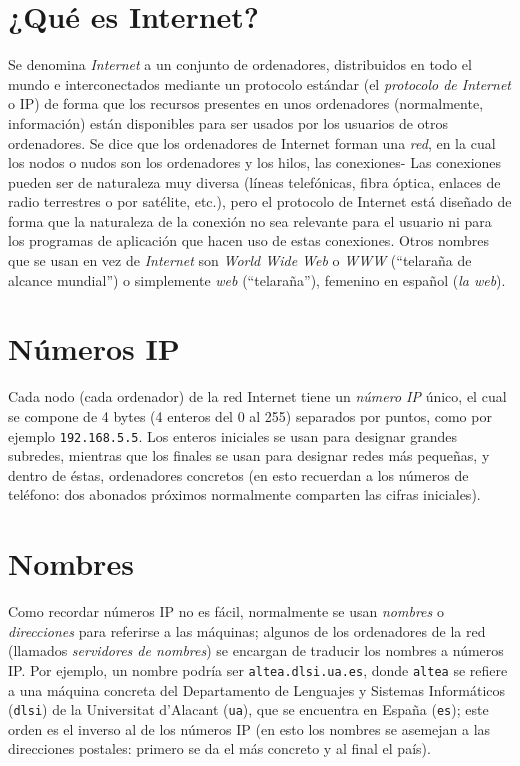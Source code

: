 \section{¿Qué es Internet?} 

Se denomina \emph{Internet} a un conjunto de ordenadores, distribuidos en todo el mundo e interconectados mediante un protocolo estándar (el \emph{protocolo de Internet} o IP) de forma que los recursos presentes en unos ordenadores (normalmente, información) están disponibles para ser usados por los usuarios de otros ordenadores. Se dice que los ordenadores de Internet forman una \emph{red}, en la cual los nodos o nudos son los ordenadores y los hilos, las conexiones- Las conexiones pueden ser de naturaleza muy diversa (líneas telefónicas, fibra óptica, enlaces de radio terrestres o por satélite, etc.), pero el protocolo de Internet está diseñado de forma que la naturaleza de la conexión no sea relevante para el usuario ni para los programas de aplicación que hacen uso de estas conexiones. Otros nombres que se usan en vez de \emph{Internet} son \emph{World Wide Web} o \emph{WWW} (``telaraña de alcance mundial'') o simplemente \emph{web} (``telaraña''), femenino en español (\emph{la web}). 

\section{Números IP} Cada nodo (cada ordenador) de la red Internet tiene un {\em número IP} único, el cual se compone de 4 bytes (4 enteros del 0 al 255) separados por puntos, como por ejemplo {\tt 192.168.5.5}. Los enteros iniciales se usan para designar grandes subredes, mientras que los finales se usan para designar redes más pequeñas, y dentro de éstas, ordenadores concretos (en esto recuerdan a los números de teléfono: dos abonados próximos normalmente comparten las cifras iniciales). 

\section{Nombres} Como recordar números IP no es fácil, normalmente se usan \emph{nombres} o \emph{direcciones} para referirse a las máquinas; algunos de los ordenadores de la red (llamados \emph{servidores de nombres}) se encargan de traducir los nombres a números IP. Por ejemplo, un nombre podría ser \texttt{altea.dlsi.ua.es}, donde \texttt{altea} se refiere a una máquina concreta del Departamento de Lenguajes y Sistemas Informáticos (\texttt{dlsi}) de la Universitat d'Alacant (\texttt{ua}), que se encuentra en España (\texttt{es}); este orden es el inverso al de los números IP (en esto los nombres se asemejan a las direcciones postales: primero se da el más concreto y al final el país). 

